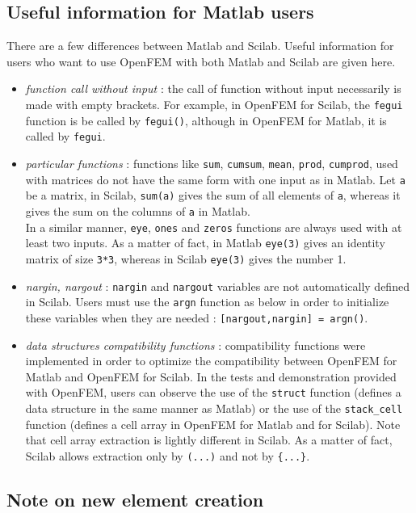 \subsection{Useful information for Matlab users}
There are a few differences between Matlab and Scilab. Useful information for users who want to use OpenFEM with both Matlab and Scilab are given here. 
\begin{itemize}
\item \emph{function call without input} : the call of function without input necessarily is made with empty brackets. For example, in OpenFEM for Scilab, the \verb+fegui+ function is be called by \verb+fegui()+, although in OpenFEM for Matlab, it is called by \verb+fegui+.
\item \emph{particular functions} : functions like \verb+sum+, \verb+cumsum+, \verb+mean+, \verb+prod+, \verb+cumprod+, used with matrices do not have the same form with one input as in Matlab. Let \verb+a+ be a matrix, in Scilab, \verb+sum(a)+ gives the sum of all elements of \verb+a+, whereas it gives the sum on the columns of \verb+a+ in Matlab.\\
In a similar manner,  \verb+eye+, \verb+ones+ and \verb+zeros+ functions are always used with at least two inputs. As a matter of fact, in Matlab \verb+eye(3)+ gives an identity matrix of size \verb+3*3+, whereas in Scilab \verb+eye(3)+ gives the number 1.
\item \emph{nargin, nargout} : \verb+nargin+ and \verb+nargout+ variables are not automatically defined in Scilab. Users must use the \verb+argn+ function as below in order to initialize these variables when they are needed :  \verb+[nargout,nargin] = argn()+. 
\item \emph{data structures compatibility functions} : compatibility functions were implemented in order to optimize the compatibility between OpenFEM for Matlab and OpenFEM for Scilab. In the tests and demonstration provided with OpenFEM, users can observe the use of the \verb+struct+ function (defines a data structure in the same manner as Matlab) or the use of the \verb+stack_cell+ function (defines a cell array in OpenFEM for Matlab and for Scilab). Note that cell array extraction is lightly different in Scilab. As a matter of fact, Scilab allows extraction only by \verb+(...)+ and not by \verb+{...}+.
\end{itemize}

\subsection{Note on new element creation}

